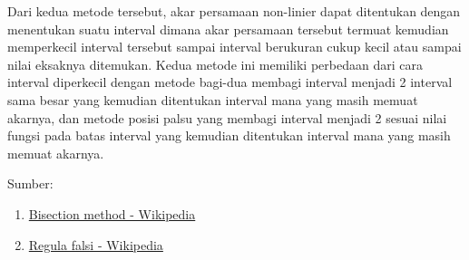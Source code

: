 \documentclass[12pt]{article}
\begin{document}
\begin{enumerate}
{        Dari kedua metode tersebut, akar persamaan non-linier dapat ditentukan dengan menentukan suatu interval dimana akar persamaan tersebut termuat kemudian memperkecil interval tersebut sampai interval berukuran cukup kecil atau sampai nilai eksaknya ditemukan. Kedua metode ini memiliki perbedaan dari cara interval diperkecil dengan metode bagi-dua membagi interval menjadi 2 interval sama besar yang kemudian ditentukan interval mana yang masih memuat akarnya, dan metode posisi palsu yang membagi interval menjadi 2 sesuai nilai fungsi pada batas interval yang kemudian ditentukan interval mana yang masih memuat akarnya.
    }\bigskip
\end{enumerate}
Sumber:
\begin{enumerate}
    \item \href{https://en.wikipedia.org/wiki/Bisection_method}{Bisection method - Wikipedia}
    \item \href{https://en.wikipedia.org/wiki/Regula_falsi}{Regula falsi - Wikipedia}
\end{enumerate}
\end{document}
